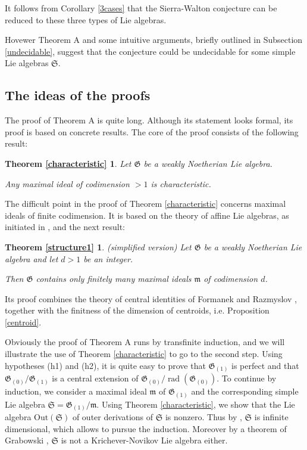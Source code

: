 \documentclass[11pt, letterpaper, reqno]{amsart}
\newtheorem*{characteristic}{Theorem \ref{characteristic}}
\newtheorem*{structure1}{Theorem \ref{structure1}}
\theoremstyle{definition}
\newcommand{\rad}{\operatorname{rad}}
\newcommand{\fm}{\mathfrak{m}}
\newcommand{\fG}{\mathfrak{G}}
\newcommand{\fS}{\mathfrak{S}}
\newcommand{\Out}{\mathrm{Out}}
\begin{document}
It follows from Corollary 
\ref{3cases} that the Sierra-Walton conjecture can be reduced to these three types of Lie algebras. 

Hovewer Theorem A and some intuitive arguments, briefly outlined in Subsection \ref{undecidable}, suggest that the conjecture could be undecidable for some simple Lie algebras $\fS$.

\subsection{The ideas of the proofs}\label{idea}



The proof of Theorem A is quite long. Although its statement looks formal, its proof is based on concrete results.
The core of the proof consists of the following  result:

\begin{characteristic}
Let $\fG$ be a weakly Noetherian Lie algebra.
 
 Any maximal ideal of codimension $>1$ is characteristic.
\end{characteristic}

The difficult point in the proof of Theorem \ref{characteristic} concerns maximal ideals of finite codimension. It is based on
the theory of affine Lie algebras, as
initiated  in \cite{Tits1,Tits2},  and the next result:

\begin{structure1} (simplified version) Let $\fG$ be a  weakly Noetherian Lie algebra and let $d> 1$ be an integer.

Then $\fG$ contains only finitely many maximal ideals $\fm$  of codimension $d$.
\end{structure1}

Its proof combines the theory of central identities of Formanek \cite{Formanek} and Razmyslov \cite{Razmyslov}, together with  the finitness of the dimension of  centroids, i.e.  Proposition \ref{centroid}.
 

Obviously  the proof of Theorem A runs by transfinite induction, and we will illustrate the use of Theorem \ref{characteristic}
to go to the second step. Using hypotheses (h1) and (h2), it is quite easy to prove that 
$\fG_{(1)}$ is perfect and that $\fG_{(0)}/\fG_{(1)}$ is a central extension of $\fG_{(0)}/\rad(\fG_{(0)})$. To continue
by induction, we consider a maximal ideal $\fm$ of $\fG_{(1)}$
and the corresponding simple Lie algebra $\fS=\fG_{(1)}/\fm$.
Using  Theorem \ref{characteristic},  we show that
the Lie algebra $\Out(\fS)$ of outer derivations of $\fS$
is nonzero. Thus 
by  \cite{Bourbaki}, $\fS$ is infinite dimensional, which allows to pursue the induction. Moreover by
a theorem of  Grabowski
\cite{Grab2}, $\fS$ is not a 
Krichever-Novikov Lie algebra either. 
\end{document}
